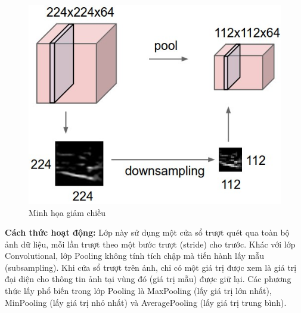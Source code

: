 \begin{center}
\begin{figure}[htp]
	\begin{center}
		\includegraphics[scale=0.5]{chap4/image/poolEx.jpeg}
	\end{center}
	\caption{Minh họa giảm chiều}
	\label{fig:pool}
\end{figure}
\end{center}
\textbf{Cách thức hoạt động:}
Lớp này sử dụng một cửa sổ trượt quét qua toàn bộ ảnh dữ liệu, mỗi lần trượt theo một bước trượt (stride) cho trước. Khác với lớp Convolutional, lớp Pooling không tính tích chập mà tiến hành lấy mẫu (subsampling). Khi cửa sổ trượt trên ảnh, chỉ có một giá trị được xem là giá trị đại diện cho thông tin ảnh tại vùng đó (giá trị mẫu) được giữ lại. Các phương thức lấy phổ biến trong lớp Pooling là MaxPooling (lấy giá trị lớn nhất), MinPooling (lấy giá trị nhỏ nhất) và AveragePooling (lấy giá trị trung bình).\\

